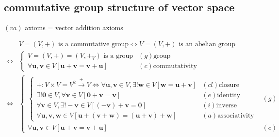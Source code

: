 \documentclass[
]{book}
\theoremstyle{definition}
\theoremstyle{definition}
\theoremstyle{definition}
\theoremstyle{definition}
\theoremstyle{remark}
\begin{document}
\subsection{commutative group structure of vector space}\label{commutative-group-structure-of-vector-space}

\(\left(va\right)\) axioms = vector addition axioms

\[
\begin{aligned}
 & V=\left(V,+\right)\text{ is a commutative group}\Leftrightarrow V=\left(V,+\right)\text{ is an abelian group}\\
\Leftrightarrow & \begin{cases}
V=\left(V,+\right)=\left(V,+_{{\scriptscriptstyle V}}\right)\text{ is a group} & \left(g\right)\text{group}\\
\forall\boldsymbol{u},\boldsymbol{v}\in V\left[\boldsymbol{u}+\boldsymbol{v}=\boldsymbol{v}+\boldsymbol{u}\right] & \left(c\right)\text{commutativity}
\end{cases}\\
\Leftrightarrow & \begin{cases}
\begin{cases}
+:V\times V=V^{2}\overset{+}{\rightarrow}V\Leftrightarrow\forall\boldsymbol{u},\boldsymbol{v}\in V,\exists!\boldsymbol{w}\in V\left[\boldsymbol{w}=\boldsymbol{u}+\boldsymbol{v}\right] & \left(cl\right)\text{closure}\\
\exists!\boldsymbol{0}\in V,\forall\boldsymbol{v}\in V\left[\boldsymbol{0}+\boldsymbol{v}=\boldsymbol{v}\right] & \left(e\right)\text{identity}\\
\forall\boldsymbol{v}\in V,\exists!-\boldsymbol{v}\in V\left[\left(-\boldsymbol{v}\right)+\boldsymbol{v}=\boldsymbol{0}\right] & \left(i\right)\text{inverse}\\
\forall\boldsymbol{u},\boldsymbol{v},\boldsymbol{w}\in V\left[\boldsymbol{u}+\left(\boldsymbol{v}+\boldsymbol{w}\right)=\left(\boldsymbol{u}+\boldsymbol{v}\right)+\boldsymbol{w}\right] & \left(a\right)\text{associativity}
\end{cases} & \left(g\right)\\
\forall\boldsymbol{u},\boldsymbol{v}\in V\left[\boldsymbol{u}+\boldsymbol{v}=\boldsymbol{v}+\boldsymbol{u}\right] & \left(c\right)
\end{cases}
\end{aligned}
\]
\end{document}
